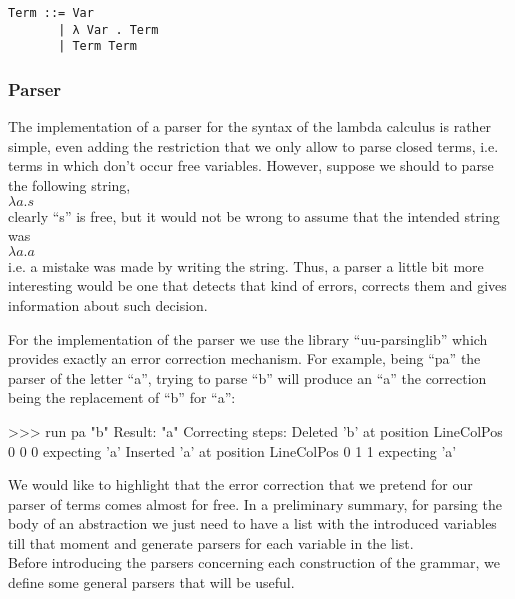 \documentclass[a4paper,10pt]{article}
\newenvironment{code}{\footnotesize\verbatim}{\endverbatim\normalsize}
\begin{document}
\begin{lstlisting}
Term ::= Var
       | λ Var . Term
       | Term Term
\end{lstlisting}

\subsubsection{Parser}

The implementation of a parser for the syntax of the lambda calculus is rather simple,
even adding the restriction that we only allow to parse closed terms, i.e. terms in which
don't occur free variables. However, suppose we should to parse the following string,\\

$\lambda a . s$\\

clearly ``s'' is free, but it would not be wrong to assume that the intended string was\\

$\lambda a . a$\\

i.e. a mistake was made by writing the string. Thus, a parser a little bit
more interesting would be one that detects that kind of errors, corrects them
and gives information about such decision.

For the implementation of the parser we use the library ``uu-parsinglib''
which provides exactly an error correction mechanism. For example, being ``pa'' the
parser of the letter ``a'', trying to parse ``b'' will produce an ``a'' the correction
being the replacement of ``b'' for ``a'':

\begin{code}
 >>> run pa  "b"
     Result: "a"
     Correcting steps: 
       Deleted   'b' at position LineColPos 0 0 0 expecting 'a'
       Inserted  'a' at position LineColPos 0 1 1 expecting 'a'
\end{code}

We would like to highlight that the error correction that we pretend for our parser
of terms comes almost for free. In a preliminary summary, for parsing the body of an 
abstraction we just need to have a list with the introduced variables till that
moment and generate parsers for each variable in the list.\\

Before introducing the parsers concerning each construction of the grammar, 
we define some general parsers that will be useful.
\end{document}
